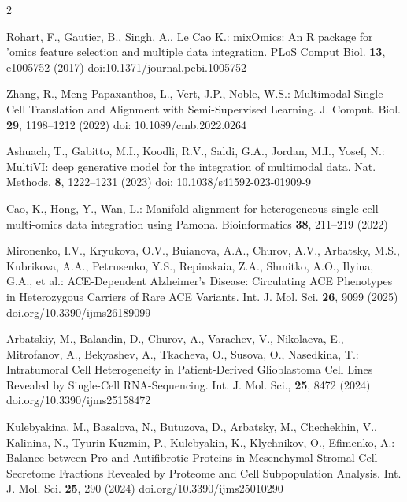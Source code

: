 \documentclass[a4paper,twoside,12pt]{article}
\begin{document}
 \begin{thebibliography}{2}


   Rohart, F., Gautier, B., Singh, A., Le Cao K.:  mixOmics: An R package for 'omics feature selection and multiple data integration.  PLoS Comput Biol.  \textbf{13},  e1005752 (2017)  doi:10.1371/journal.pcbi.1005752



  Zhang, R., Meng-Papaxanthos, L., Vert, J.P., Noble, W.S.:  Multimodal Single-Cell Translation and Alignment with Semi-Supervised Learning.  J. Comput. Biol.  \textbf{29},  1198--1212 (2022) doi: 10.1089/cmb.2022.0264


   Ashuach, T., Gabitto, M.I., Koodli, R.V., Saldi, G.A., Jordan, M.I., Yosef, N.: MultiVI: deep generative model for the integration of multimodal data. Nat. Methods. \textbf{8},  1222--1231 (2023) doi: 10.1038/s41592-023-01909-9


    Cao, K., Hong, Y., Wan, L.:  Manifold alignment for heterogeneous single-cell
multi-omics data integration using Pamona.  Bioinformatics
 \textbf{38},  211--219  (2022)


   Mironenko, I.V., Kryukova, O.V., Buianova, A.A., Churov, A.V., Arbatsky, M.S., Kubrikova, A.A., Petrusenko, Y.S., Repinskaia, Z.A.,
 Shmitko, A.O., Ilyina, G.A., et al.:  ACE-Dependent Alzheimer's Disease: Circulating ACE Phenotypes in Heterozygous Carriers of Rare ACE Variants.  Int. J. Mol. Sci.     \textbf{26},    9099   (2025) doi.org/10.3390/ijms26189099




   Arbatskiy, M., Balandin, D., Churov, A., Varachev, V., Nikolaeva, E., Mitrofanov, A., Bekyashev, A., Tkacheva, O., Susova,
O., Nasedkina, T.:  Intratumoral Cell Heterogeneity in Patient-Derived Glioblastoma Cell Lines Revealed by Single-Cell RNA-Sequencing.  Int. J. Mol. Sci.,  \textbf{25}, 8472 (2024)  doi.org/10.3390/ijms25158472




  Kulebyakina, M., Basalova, N., Butuzova, D., Arbatsky, M., Chechekhin, V., Kalinina, N., Tyurin-Kuzmin, P., Kulebyakin, K.,
Klychnikov, O., Efimenko, A.:   Balance between Pro and Antifibrotic Proteins in Mesenchymal Stromal Cell Secretome Fractions Revealed by Proteome and Cell Subpopulation Analysis.   Int. J. Mol. Sci.   \textbf{25},   290  (2024)   doi.org/10.3390/ijms25010290




\end{thebibliography}
\end{document}
